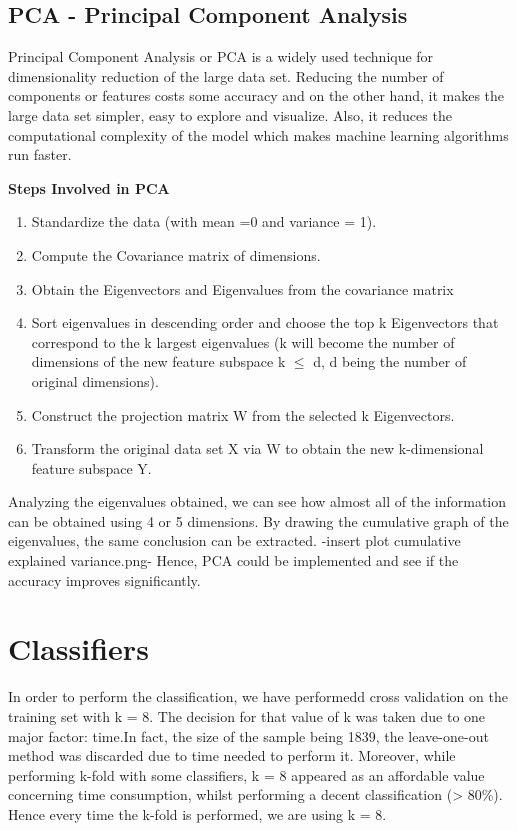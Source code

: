 \documentclass[twoside,a4paper,12pt]{report}
\begin{document}
\subsection{PCA - Principal Component Analysis}

Principal Component Analysis or PCA is a widely used technique for dimensionality 
reduction of the large data set. Reducing the number of components or features costs
 some accuracy and on the other hand, it makes the large data set simpler, easy to 
 explore and visualize. Also, it reduces the computational complexity of the model 
 which makes machine learning algorithms run faster.

\textbf{Steps Involved in PCA}
\begin{enumerate}
    \item Standardize the data (with mean =0 and variance = 1).
    \item Compute the Covariance matrix of dimensions.
    \item Obtain the Eigenvectors and Eigenvalues from the covariance matrix
    \item Sort eigenvalues in descending order and choose the top k Eigenvectors 
    that correspond to the k largest eigenvalues (k will become the number of 
    dimensions of the new feature subspace k $\leq$ d, d being the number of original dimensions).
    \item Construct the projection matrix W from the selected k Eigenvectors.
    \item Transform the original data set X via W to obtain the new k-dimensional feature subspace Y.
\end{enumerate}

Analyzing the eigenvalues obtained,  we can see how almost all of the information
can be obtained using 4 or 5 dimensions.
By drawing the cumulative graph of the eigenvalues, the same conclusion can be extracted.
 -insert plot cumulative explained variance.png-
Hence, PCA could be implemented and see if the accuracy improves significantly.


\section{Classifiers}
In order to perform the classification, we have performedd cross validation on the 
training set with k = 8.
The decision for that value of k was taken due to one major factor: time.In fact, the size of the sample being 
1839, the leave-one-out method was discarded due to time needed to perform it.
Moreover, while performing k-fold with some classifiers, k = 8 appeared as an affordable value 
concerning time consumption, whilst performing a decent classification (> 80\%).
Hence every time the k-fold is performed, we are using k = 8.
\end{document}
